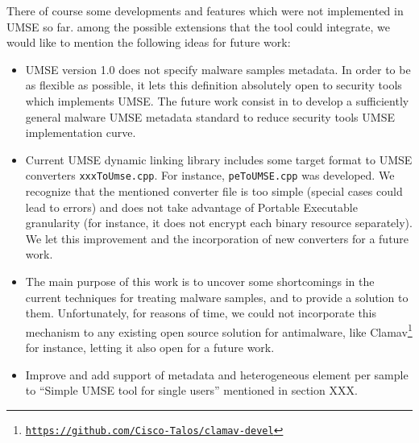 There of course some developments and features which were not implemented in
UMSE so far. among the possible extensions that the tool could integrate, we
would like to mention the following ideas for future work:
\begin{itemize}
\item UMSE version 1.0 does not specify malware samples metadata. In order to
  be as flexible as possible, it lets this definition absolutely open to
  security tools which implements UMSE. The future work consist in to develop
  a sufficiently general malware UMSE metadata standard to reduce security
  tools UMSE implementation curve.
\item Current UMSE dynamic linking library includes some target format to UMSE
  converters \texttt{xxxToUmse.cpp}. For instance, \texttt{peToUMSE.cpp} was
  developed. We recognize that the mentioned converter file is too simple
  (special cases could lead to errors) and does not take advantage of Portable
  Executable granularity (for instance, it does not encrypt each binary
  resource separately). We let this improvement and the incorporation of new
  converters for a future work.
\item The main purpose of this work is to uncover some shortcomings in the
  current techniques for treating malware samples, and to provide a solution
  to them. Unfortunately, for reasons of time, we could not incorporate this
  mechanism to any existing open source solution for antimalware, like
  Clamav\footnote{\href{https://github.com/Cisco-Talos/clamav-devel}{\texttt{https://github.com/Cisco-Talos/clamav-devel}}}
  for instance, letting it also open for a future work.
\item Improve and add support of metadata and heterogeneous element per sample
  to ``Simple UMSE tool for single users'' mentioned in section XXX.
\end{itemize}